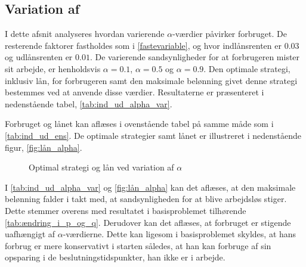     

\subsection[Variation af  \texorpdfstring{$\alpha$}{alpha}]{Variation af \bm{$\alpha$}}
I dette afsnit analyseres hvordan varierende $\alpha$-værdier påvirker forbruget. De resterende faktorer fastholdes som i \eqref{fastevariable}, og hvor indlånsrenten er $0.03$ og udlånsrenten er $0.01$. De varierende sandsynligheder for at forbrugeren mister sit arbejde, er henholdsvis $\alpha=0.1$, $\alpha=0.5$ og $\alpha=0.9$. Den optimale strategi, inklusiv lån, for forbrugeren samt den maksimale belønning givet denne strategi bestemmes ved at anvende disse værdier. Resultaterne er præsenteret i nedenstående tabel, \autoref{tab:ind_ud_alpha_var}.



Forbruget og lånet kan aflæses i ovenstående tabel på samme måde som i \autoref{tab:ind_ud_ens}. De optimale strategier samt lånet er illustreret i nedenstående figur, \autoref{fig:lån_alpha}.

\begin{figure}[H]
    \begin{center}
        \resizebox{8cm}{!}{}
        \resizebox{8cm}{!}{}
    \end{center}
    \caption{Optimal strategi og lån ved variation af $\alpha$}\label{fig:lån_alpha}
\end{figure}
 
I \autoref{tab:ind_ud_alpha_var} og \autoref{fig:lån_alpha} kan det aflæses, at den maksimale belønning falder i takt med, at sandsynligheden for at blive arbejdsløs stiger. Dette stemmer overens med resultatet i basisproblemet tilhørende \autoref{tab:ændring_i_p_og_q}. Derudover kan det aflæses, at forbruget er stigende uafhængigt af $\alpha$-værdierne. Dette kan ligesom i basisproblemet skyldes, at hans forbrug er mere konservativt i starten således, at han kan forbruge af sin opsparing i de beslutningstidspunkter, han ikke er i arbejde. 

